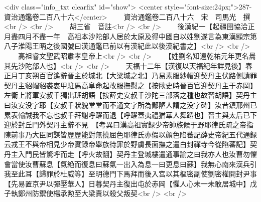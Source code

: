 <div class="info_txt clearfix" id="show">
<center style="font-size:24px;">287-資治通鑑卷二百八十六</center>
  　　資治通鑑卷二百八十六　宋　司馬光　撰<br />
<br />
　　胡三省　音註<br />
<br />
　　後漢紀一【起疆圉協洽正月盡四月不盡一年　高祖本沙陀部人居於太原及得中國自以姓劉遂言為東漢顯宗第八子淮陽王昞之後國號曰漢通鑑已前以有漢紀此以後漢紀書之】<br />
<br />
　　高祖睿文聖武昭肅孝皇帝上<br />
<br />
　　【姓劉名知遠乾祐元年更名暠其先沙陀部人也】<br />
<br />
　　天福十二年【漢復以天福紀年詳見後】春正月丁亥朔百官遙辭晉主於城北【大梁城之北】乃易素服紗帽迎契丹主伏路側請罪契丹主貂帽貂裘衷甲駐馬高阜命起改服撫慰之【按歐史時晉百官迎契丹主于赤岡】左衛上將軍安叔千獨出班胡語【按薛史安叔千沙陀三部落之種也故習胡語】契丹主曰汝安没字耶【安叔千狀貌堂堂而不通文字所為鄙陋人謂之没字碑】汝昔鎮邢州已累表輸誠我不忘也叔千拜謝呼躍而退【呼躍蓋夷禮猶華人舞蹈也】晉主與太后已下迎於封丘門外契丹主辭不見　【考異曰漢高祖實録少帝帥族候于野耶律氏疏之帝指陳前事乃大臣同謀皆歷歷能對無撓屈色耶律氏亦假以顔色陷蕃記薛史帝紀五代通録云戎王不與帝相見少帝實録帝舉族待罪於野虜長面撫之遣白封禪寺今從陷蕃記】契丹主入門民皆驚呼而走【呼火故翻】契丹主登城樓遣通事諭之曰我亦人也汝曹勿懼會當使汝曹蘇息【氣絶而復息曰蘇氣一出入為息一曰更息曰蘇】我無心南來漢兵引我至此耳【歸罪於杜威等】至明德門下馬拜而後入宫以其樞密副使劉密權開封尹事【先易置京尹以彈壓華人】日暮契丹主復出屯於赤岡【懼人心未一未敢居城中】戊子執鄭州防禦使楊承勲至大梁責以殺父叛契<br />
<br />
